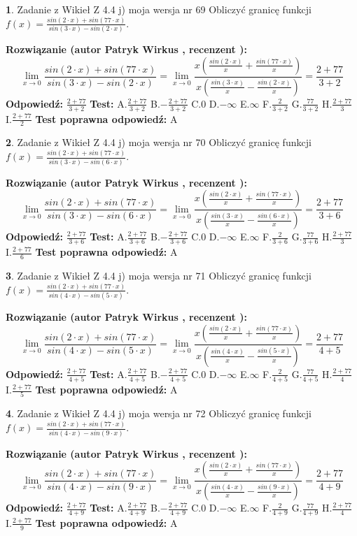 \documentclass[12pt, a4paper]{article}
\theoremstyle{definition} %
\newtheorem{zad}{}
\newcommand{\zadStart}[1]{\begin{zad}#1\newline}
\newcommand{\zadStop}{\end{zad}}
\newcommand{\rozwStart}[2]{\noindent \textbf{Rozwiązanie (autor #1 , recenzent #2): }\newline}
\newcommand{\rozwStop}{\newline}
\newcommand{\odpStart}{\noindent \textbf{Odpowiedź:}\newline}
\newcommand{\odpStop}{\newline}
\newcommand{\testStart}{\noindent \textbf{Test:}\newline}
\newcommand{\testStop}{\newline}
\newcommand{\kluczStart}{\noindent \textbf{Test poprawna odpowiedź:}\newline}
\newcommand{\kluczStop}{\newline}
\begin{document}
\zadStart{Zadanie z Wikieł Z 4.4 j) moja wersja nr 69}
Obliczyć granicę funkcji $f(x)=\frac{sin(2\cdot x) +sin(77\cdot x)}{sin(3\cdot x) -sin(2\cdot x)}$.
\zadStop
\rozwStart{Patryk Wirkus}{}
$$\lim\limits_{x\to 0}\frac{sin(2\cdot x) +sin(77\cdot x)}{sin(3\cdot x) -sin(2\cdot x)}=\lim\limits_{x\to 0}\frac{x(\frac{sin(2\cdot x)}{x}+\frac{sin(77\cdot x)}{x})}{x(\frac{sin(3\cdot x)}{x}-\frac{sin(2\cdot x)}{x})}=\frac{2+77}{3+2}$$
\rozwStop
\odpStart
$\frac{2+77}{3+2}$
\odpStop
\testStart
A.$\frac{2+77}{3+2}$
B.$-\frac{2+77}{3+2}$
C.$0$
D.$-\infty$
E.$\infty$
F.$\frac{2}{3+2}$
G.$\frac{77}{3+2}$
H.$\frac{2+77}{3}$
I.$\frac{2+77}{2}$
\testStop
\kluczStart
A
\kluczStop



\zadStart{Zadanie z Wikieł Z 4.4 j) moja wersja nr 70}
Obliczyć granicę funkcji $f(x)=\frac{sin(2\cdot x) +sin(77\cdot x)}{sin(3\cdot x) -sin(6\cdot x)}$.
\zadStop
\rozwStart{Patryk Wirkus}{}
$$\lim\limits_{x\to 0}\frac{sin(2\cdot x) +sin(77\cdot x)}{sin(3\cdot x) -sin(6\cdot x)}=\lim\limits_{x\to 0}\frac{x(\frac{sin(2\cdot x)}{x}+\frac{sin(77\cdot x)}{x})}{x(\frac{sin(3\cdot x)}{x}-\frac{sin(6\cdot x)}{x})}=\frac{2+77}{3+6}$$
\rozwStop
\odpStart
$\frac{2+77}{3+6}$
\odpStop
\testStart
A.$\frac{2+77}{3+6}$
B.$-\frac{2+77}{3+6}$
C.$0$
D.$-\infty$
E.$\infty$
F.$\frac{2}{3+6}$
G.$\frac{77}{3+6}$
H.$\frac{2+77}{3}$
I.$\frac{2+77}{6}$
\testStop
\kluczStart
A
\kluczStop



\zadStart{Zadanie z Wikieł Z 4.4 j) moja wersja nr 71}
Obliczyć granicę funkcji $f(x)=\frac{sin(2\cdot x) +sin(77\cdot x)}{sin(4\cdot x) -sin(5\cdot x)}$.
\zadStop
\rozwStart{Patryk Wirkus}{}
$$\lim\limits_{x\to 0}\frac{sin(2\cdot x) +sin(77\cdot x)}{sin(4\cdot x) -sin(5\cdot x)}=\lim\limits_{x\to 0}\frac{x(\frac{sin(2\cdot x)}{x}+\frac{sin(77\cdot x)}{x})}{x(\frac{sin(4\cdot x)}{x}-\frac{sin(5\cdot x)}{x})}=\frac{2+77}{4+5}$$
\rozwStop
\odpStart
$\frac{2+77}{4+5}$
\odpStop
\testStart
A.$\frac{2+77}{4+5}$
B.$-\frac{2+77}{4+5}$
C.$0$
D.$-\infty$
E.$\infty$
F.$\frac{2}{4+5}$
G.$\frac{77}{4+5}$
H.$\frac{2+77}{4}$
I.$\frac{2+77}{5}$
\testStop
\kluczStart
A
\kluczStop



\zadStart{Zadanie z Wikieł Z 4.4 j) moja wersja nr 72}
Obliczyć granicę funkcji $f(x)=\frac{sin(2\cdot x) +sin(77\cdot x)}{sin(4\cdot x) -sin(9\cdot x)}$.
\zadStop
\rozwStart{Patryk Wirkus}{}
$$\lim\limits_{x\to 0}\frac{sin(2\cdot x) +sin(77\cdot x)}{sin(4\cdot x) -sin(9\cdot x)}=\lim\limits_{x\to 0}\frac{x(\frac{sin(2\cdot x)}{x}+\frac{sin(77\cdot x)}{x})}{x(\frac{sin(4\cdot x)}{x}-\frac{sin(9\cdot x)}{x})}=\frac{2+77}{4+9}$$
\rozwStop
\odpStart
$\frac{2+77}{4+9}$
\odpStop
\testStart
A.$\frac{2+77}{4+9}$
B.$-\frac{2+77}{4+9}$
C.$0$
D.$-\infty$
E.$\infty$
F.$\frac{2}{4+9}$
G.$\frac{77}{4+9}$
H.$\frac{2+77}{4}$
I.$\frac{2+77}{9}$
\testStop
\kluczStart
A
\kluczStop
\end{document}
